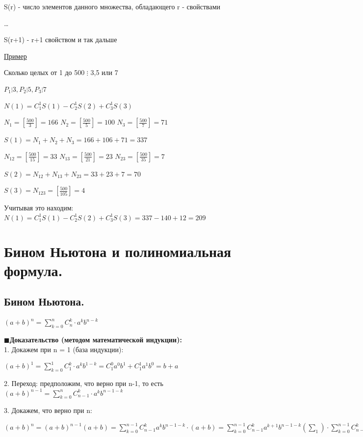 \documentclass[12pt, a4paper]{article}
\begin{document}
S(r) - число элементов данного множества, обладающего r - свойствами

\dots

S(r+1) - r+1 свойством и так дальше

\underline{Пример}

Сколько целых от 1 до 500 $\vdots$ 3,5 или 7

$P_1 \vdots 3, P_2 \vdots 5, P_3 \vdots 7$

$N(1) = C_1^1 S(1) - C_2^1 S(2) + C_3^1 S(3)$ 

$N_1 = [\frac{500}{3}] = 166$
$N_2 = [\frac{500}{5}] = 100$
$N_3 = [\frac{500}{7}] = 71$

$S(1) = N_1 + N_2 + N_3 = 166 + 106 + 71 = 337$

$N_{12}= [\frac{500}{15}]=33$
$N_{13}= [\frac{500}{21}]=23$
$N_{23}= [\frac{500}{35}]=7$

$S(2) = N_{12} + N_{13} + N_{23}= 33 + 23 + 7 = 70$ 


$S(3) = N_{123} = [\frac{500}{105}] = 4$

Учитывая это находим: $N(1) = C_1^1 S(1) - C_2^1 S(2) + C_3^1 S(3) = 337 - 140 + 12 = 209$

\section{Бином Ньютона и полиномиальная формула.}

\subsection{Бином Ньютона.}


$(a+b)^n = \sum\limits_{k=0}^n  C_{n}^{k} \cdot a^k b^{n-k}$

\(\blacksquare\)\textbf{Доказательство (методом математической индукции):}\\

1. Докажем при n = 1 (база индукции):

$(a+b)^1 = \sum\limits_{k=0}^1  C_{1}^{k} \cdot a^k b^{1-k} = C_{1}^{0}a^0b^1 + C_{1}^{1}a^1b^0 = b + a$

2. Переход: предположим, что верно при n-1, то есть $(a + b)^{n-1} = \sum\limits_{k=0}^n  C_{n-1}^{k} \cdot a^k b^{n-1-k}$

3. Докажем, что верно при n:

$(a+b)^{n} = (a+b)^{n-1}(a+b) = \sum\limits_{k=0}^{n-1} C_{n-1}^{k} a^k b^{n-1-k} \cdot (a+b) = \sum\limits_{k=0}^{n-1} C_{n-1}^{k} a^{k+1} b^{n-1-k}(\sum_1) \cdot \sum\limits_{k=0}^{n-1} C_{n-1}^{k} a^k b^{n-k}(\sum_2) $
\end{document}
